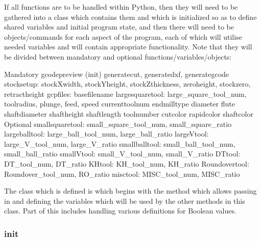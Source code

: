 \documentclass{ltxdoc}
\begin{document}
If all functions are to be handled within Python, then they will need to be gathered into a class which contains them and which is initialized so as to define shared variables and initial program state, and then there will need to be objects/commands for each aspect of the program, each of which will utilise needed variables and will contain appropriate functionality. Note that they will be divided between mandatory and optional functions/variables/objects:

\begin{outline}
\1 Mandatory
   \2 gcodepreview (init)
      \3 generatecut, generatedxf, generategcode
   \2 stocksetup:
      \3 stockXwidth, stockYheight, stockZthickness, zeroheight, stockzero, retract\-height
   \2 gcpfiles: 
      \3 basefilename
   \2 largesquaretool: 
      \3 large\_square\_tool\_num, toolradius, plunge, feed, speed
   \2 currenttoolnum
      \3 endmilltype
      \3 diameter
      \3 flute
      \3 shaftdiameter
      \3 shaftheight
      \3 shaftlength
      \3 toolnumber
      \3 cutcolor
      \3 rapidcolor
      \3 shaftcolor
\1 Optional
   \2 smallsquaretool: 
      \3small\_square\_tool\_num, small\_square\_ratio
   \2 largeballtool: 
      \3 large\_ball\_tool\_num, large\_ball\_ratio
   \2 largeVtool: 
      \3 large\_V\_tool\_num, large\_V\_ratio
   \2 smallballtool: 
      \3 small\_ball\_tool\_num, small\_ball\_ratio
   \2 smallVtool: 
      \3 small\_V\_tool\_num, small\_V\_ratio
   \2 DTtool: 
      \3 DT\_tool\_num, DT\_ratio
   \2 KHtool: 
      \3 KH\_tool\_num, KH\_ratio
   \2 Roundovertool: 
      \3 Roundover\_tool\_num, RO\_ratio
   \2 misctool: 
      \3 MISC\_tool\_num, MISC\_ratio
\end{outline}

The class which is defined is  which begins with the  method which allows passing in and defining the variables which will be used by the other methods in this class. Part of this includes handling various definitions for Boolean values.


\subsubsection{init}
\end{document}

